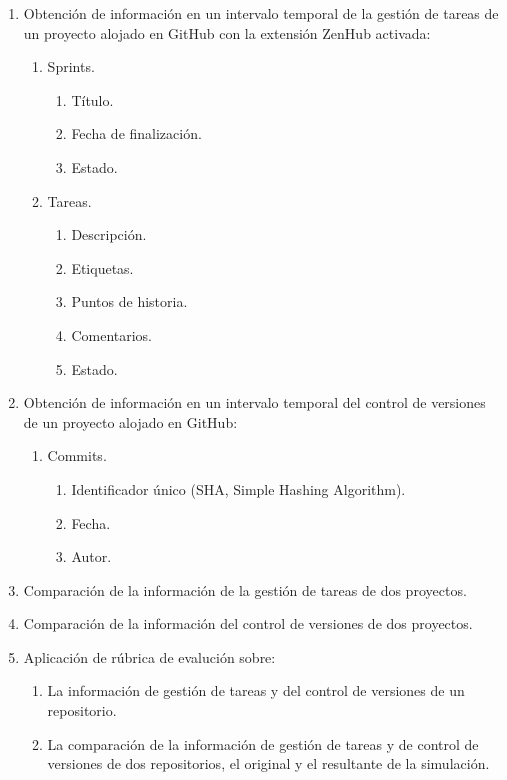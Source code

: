 \begin{enumerate}
	\item Obtención de información en un intervalo temporal de la gestión de tareas de un proyecto alojado en GitHub con la extensión ZenHub activada:
	\begin{enumerate}
		\item Sprints.
		\begin{enumerate}
			\item Título. 
			\item Fecha de finalización.
			\item Estado.	
		\end{enumerate}	
		\item Tareas.	
		\begin{enumerate}
			\item Descripción. 
			\item Etiquetas.
			\item Puntos de historia.
			\item Comentarios.
			\item Estado.	
		\end{enumerate}	
	\end{enumerate}		
	\item Obtención de información en un intervalo temporal del control de versiones de un proyecto alojado en GitHub:
	\begin{enumerate}
		\item Commits. 
			\begin{enumerate}
				\item Identificador único (SHA, Simple Hashing Algorithm). 
				\item Fecha.
				\item Autor.
			\end{enumerate}		
	\end{enumerate}
	\item Comparación de la información de la gestión de tareas de dos proyectos.
	\item Comparación de la información del control de versiones de dos proyectos.			
	\item Aplicación de rúbrica de evalución  sobre:
	\begin{enumerate}
		\item La información de gestión de tareas y del control de versiones de un repositorio. 
		\item La comparación de la información de gestión de tareas y de control de versiones de dos repositorios, el original y el resultante de la simulación.	
	\end{enumerate}			  
\end{enumerate}

